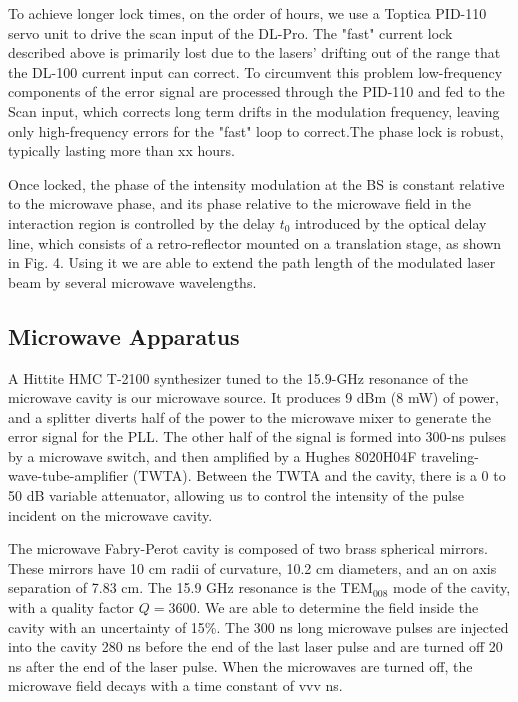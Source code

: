 \documentclass[aps,pra,preprint,groupedaddress]{revtex4-1}
\begin{document}
To achieve longer lock times, on the order of hours, we use a Toptica PID-110 servo unit to drive the scan input of the DL-Pro. The "fast" current lock described above is primarily lost due to the lasers' drifting out of the range that the DL-100 current input can correct. To circumvent this problem low-frequency components of the error signal are processed through the PID-110 and fed to the Scan input, which corrects long term drifts in the modulation frequency, leaving only high-frequency errors for the "fast" loop to correct.The phase lock is robust, typically lasting more than xx hours.



Once locked, the phase of the intensity modulation at the BS is constant relative to the microwave phase, and its phase relative to the microwave field in the interaction region is controlled by the delay $t_0$ introduced by the optical delay line, which consists of a retro-reflector mounted on a translation stage, as shown in Fig. 4. Using it we are able to extend the path length of the modulated laser beam by several microwave wavelengths.

\subsection{\label{cavity} Microwave Apparatus}

A Hittite HMC T-2100 synthesizer tuned to the 15.9-GHz resonance of the microwave cavity is our microwave source. It produces 9 dBm (8 mW) of power, and a splitter diverts half of the power to the microwave mixer to generate the error signal for the PLL. The other half of the signal is formed into 300-ns pulses by a microwave switch, and then amplified by a Hughes 8020H04F traveling-wave-tube-amplifier (TWTA). Between the TWTA and the cavity, there is a 0 to 50 dB variable attenuator, allowing us to control the intensity of the pulse incident on the microwave cavity.

The microwave Fabry-Perot cavity is composed of two brass spherical mirrors. These mirrors have 10 cm radii of curvature, 10.2 cm diameters, and an on axis separation of 7.83 cm. The 15.9 GHz resonance is the TEM$_{008}$ mode of the cavity, with a quality factor $Q=3600$. We are able to determine the field inside the cavity with an uncertainty of 15\%. The 300 ns long microwave pulses are injected into the cavity 280 ns before the end of the last laser pulse and are turned off 20 ns after the end of the laser pulse. When the microwaves are turned off, the microwave field decays with a time constant of vvv ns.
\end{document}
